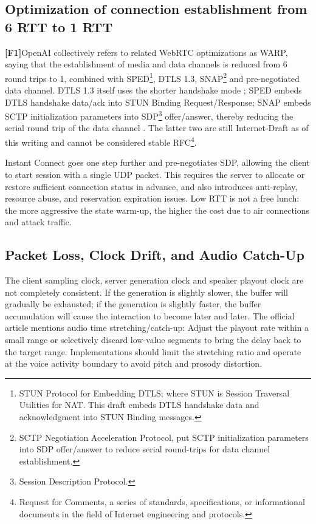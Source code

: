 \documentclass[UTF8,fontset=none,a4paper,10pt]{ctexart}
\newcommand{\FOne}{\textcolor{official}{\textbf{[F1]}}}
\begin{document}
\subsection{Optimization of connection establishment from 6 RTT to 1 RTT}

\FOne OpenAI collectively refers to related WebRTC optimizations as WARP, saying that the establishment of media and data channels is reduced from 6 round trips to 1, combined with SPED\footnote{STUN Protocol for Embedding DTLS; where STUN is Session Traversal Utilities for NAT. This draft embeds DTLS handshake data and acknowledgment into STUN Binding messages. }, DTLS 1.3, SNAP\footnote{SCTP Negotiation Acceleration Protocol, put SCTP initialization parameters into SDP offer/answer to reduce serial round-trips for data channel establishment. } and pre-negotiated data channel\cite{openai2026continuous}. DTLS 1.3 itself uses the shorter handshake mode \cite{rescorla2022dtls13}; SPED embeds DTLS handshake data/ack into STUN Binding Request/Response; SNAP embeds SCTP initialization parameters into SDP\footnote{Session Description Protocol. } offer/answer, thereby reducing the serial round trip of the data channel \cite{hancke2026sped,hancke2026snap}. The latter two are still Internet-Draft as of this writing and cannot be considered stable RFC\footnote{Request for Comments, a series of standards, specifications, or informational documents in the field of Internet engineering and protocols. }.

Instant Connect goes one step further and pre-negotiates SDP, allowing the client to start session \cite{openai2026continuous} with a single UDP packet. This requires the server to allocate or restore sufficient connection status in advance, and also introduces anti-replay, resource abuse, and reservation expiration issues. Low RTT is not a free lunch: the more aggressive the state warm-up, the higher the cost due to air connections and attack traffic.

\subsection{Packet Loss, Clock Drift, and Audio Catch-Up}

The client sampling clock, server generation clock and speaker playout clock are not completely consistent. If the generation is slightly slower, the buffer will gradually be exhausted; if the generation is slightly faster, the buffer accumulation will cause the interaction to become later and later. The official article mentions audio time stretching/catch-up\cite{openai2026continuous}: Adjust the playout rate within a small range or selectively discard low-value segments to bring the delay back to the target range. Implementations should limit the stretching ratio and operate at the voice activity boundary to avoid pitch and prosody distortion.
\end{document}
